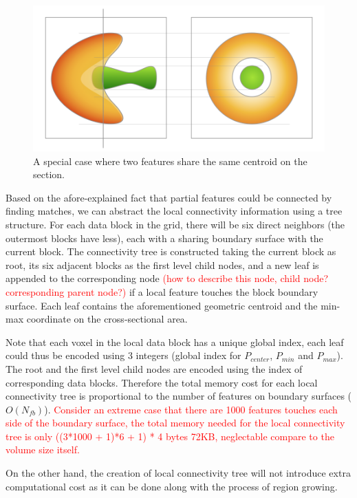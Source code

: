 \documentclass[10pt, conference, compsocconf]{IEEEtran}
\begin{document}
\begin{figure}[ht]
	\centering
	\includegraphics[width=0.9\linewidth]{figure1@2x.png}
	\caption{A special case where two features share the same centroid on the section.}
	\label{fig:special}
\end{figure}

Based on the afore-explained fact that partial features could be connected by finding matches, we can abstract the local connectivity information using a tree structure. For each data block in the grid, there will be six direct neighbors (the outermost blocks have less), each with a sharing boundary surface with the current block. The connectivity tree is constructed taking the current block as root, its six adjacent blocks as the first level child nodes, and a new leaf is appended to the corresponding node \textcolor{red}{(how to describe this node, child node? corresponding parent node?)} if a local feature touches the block boundary surface. Each leaf contains the aforementioned geometric centroid and the min-max coordinate on the cross-sectional area. 

Note that each voxel in the local data block has a unique global index, each leaf could thus be encoded using 3 integers (global index for $P_{center}$, $P_{min}$ and $P_{max}$). The root and the first level child nodes are encoded using the index of corresponding data blocks. Therefore the total memory cost for each local connectivity tree is proportional to the number of features on boundary surfaces ($O(N_{fb})$). \textcolor{red}{Consider an extreme case that there are 1000 features touches each side of the boundary surface, the total memory needed for the local connectivity tree is only ((3*1000 + 1)*6 + 1) * 4 bytes \approx 72KB, neglectable compare to the volume size itself.}

On the other hand, the creation of local connectivity tree will not introduce extra computational cost as it can be done along with the process of region growing. 
\end{document}
